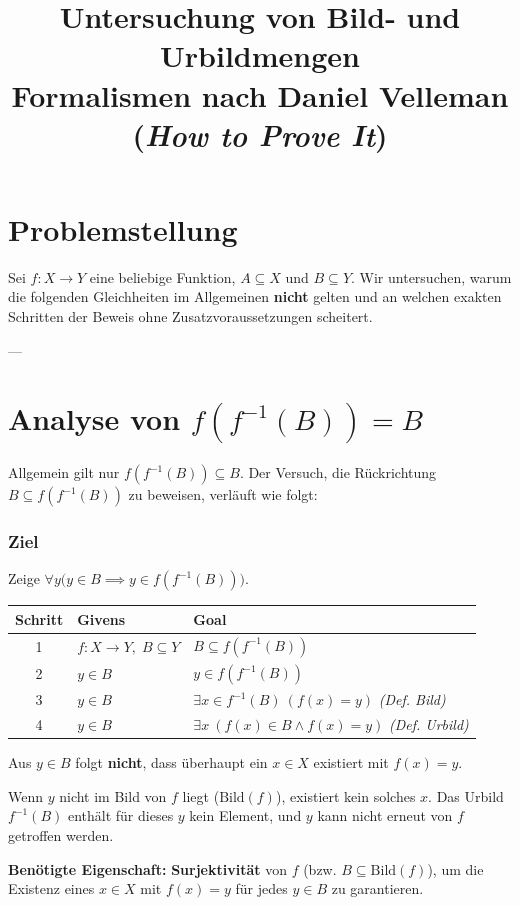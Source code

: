 \documentclass[11pt,a4paper]{article}
\title{\textbf{Untersuchung von Bild- und Urbildmengen}\\[0.3em]
\large Formalismen nach Daniel Velleman (\textit{How to Prove It})}
\author{}
\date{}
\begin{document}
\maketitle

\section*{Problemstellung}
Sei $f: X \to Y$ eine beliebige Funktion, $A \subseteq X$ und $B \subseteq Y$. Wir untersuchen, warum die folgenden Gleichheiten im Allgemeinen \textbf{nicht} gelten und an welchen exakten Schritten der Beweis ohne Zusatzvoraussetzungen scheitert.

---

\section{Analyse von $f(f^{-1}(B)) = B$}

Allgemein gilt nur $f(f^{-1}(B)) \subseteq B$. Der Versuch, die Rückrichtung $B \subseteq f(f^{-1}(B))$ zu beweisen, verläuft wie folgt:

\subsubsection*{Ziel}
Zeige $\forall y \bigl(y \in B \implies y \in f(f^{-1}(B))\bigr)$.

\begin{vellemantable}
\centering
\begin{tabular}{cll}
\textbf{Schritt} & \textbf{Givens} & \textbf{Goal} \\ \hline
1 & $f: X \to Y, \; B \subseteq Y$ & $B \subseteq f(f^{-1}(B))$ \\
2 & $y \in B$ & $y \in f(f^{-1}(B))$ \\
3 & $y \in B$ & $\exists x \in f^{-1}(B) \: (f(x) = y)$ \quad \textit{(Def. Bild)} \\
4 & $y \in B$ & $\exists x \: (f(x) \in B \land f(x) = y)$ \quad \textit{(Def. Urbild)} \\
\end{tabular}
\end{vellemantable}

\begin{stuckbox}
Aus $y \in B$ folgt \textbf{nicht}, dass überhaupt ein $x \in X$ existiert mit $f(x) = y$.

Wenn $y$ nicht im Bild von $f$ liegt ($\text{Bild}(f)$), existiert kein solches $x$. Das Urbild $f^{-1}(B)$ enthält für dieses $y$ kein Element, und $y$ kann nicht erneut von $f$ getroffen werden.

\medskip
\textbf{Benötigte Eigenschaft:} \textbf{Surjektivität} von $f$ (bzw. $B \subseteq \text{Bild}(f)$), um die Existenz eines $x \in X$ mit $f(x) = y$ für jedes $y \in B$ zu garantieren.
\end{stuckbox}
\end{document}
